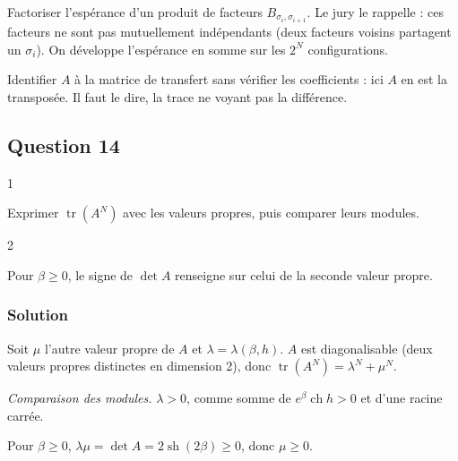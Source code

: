 \documentclass[11pt,a4paper]{article}
\begin{document}
\begin{piege}

Factoriser l'espérance d'un produit de facteurs \(B_{\sigma_i,\sigma_{i+1}}\). Le jury le rappelle : ces facteurs ne sont pas mutuellement indépendants (deux facteurs voisins partagent un \(\sigma_i\)). On développe l'espérance en somme sur les \(2^N\) configurations.

\end{piege}

\begin{piege}

Identifier \(A\) à la matrice de transfert sans vérifier les coefficients : ici \(A\) en est la transposée. Il faut le dire, la trace ne voyant pas la différence.

\end{piege}

\hypertarget{question-14}{%
\subsection{Question 14}\label{question-14}}

\begin{indication}{1}

Exprimer \(\operatorname{tr}(A^N)\) avec les valeurs propres, puis comparer leurs modules.

\end{indication}

\begin{indication}{2}

Pour \(\beta\geqslant0\), le signe de \(\det A\) renseigne sur celui de la seconde valeur propre.

\end{indication}

\hypertarget{solution-13}{%
\subsubsection{Solution}\label{solution-13}}

Soit \(\mu\) l'autre valeur propre de \(A\) et \(\lambda=\lambda(\beta,h)\). \(A\) est diagonalisable (deux valeurs propres distinctes en dimension 2), donc \(\operatorname{tr}(A^N)=\lambda^N+\mu^N\).

\emph{Comparaison des modules.} \(\lambda>0\), comme somme de \(e^\beta\operatorname{ch}h>0\) et d'une racine carrée.

Pour \(\beta\geqslant0\), \(\lambda\mu=\det A=2\operatorname{sh}(2\beta)\geqslant0\), donc \(\mu\geqslant0\).
\end{document}
